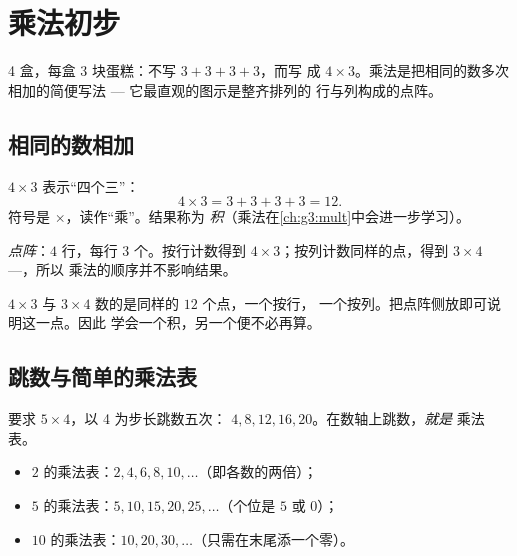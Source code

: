 \chapter{乘法初步}\label{ch:g2:mult}

4 盒，每盒 3 块蛋糕：不写 $3 + 3 + 3 + 3$，而写
成 $4 \times 3$。乘法是把相同的数多次相加的简便写法 ---
它最直观的图示是整齐排列的
行与列构成的点阵。

\section{相同的数相加}

\begin{definition}[乘法]\label{def:g2:mult:def}
$4 \times 3$ 表示“四个三”：
\[
4 \times 3 = 3 + 3 + 3 + 3 = 12 .
\]
符号是 $\times$，读作“乘”。结果称为
\emph{积}（乘法在\cref{ch:g3:mult}中会进一步学习）。
\end{definition}

\begin{omfigure}

{\small \emph{点阵}：$4$ 行，每行 $3$ 个。按行计数得到
$4 \times 3$；按列计数同样的点，得到 $3 \times 4$ ---，所以
乘法的顺序并不影响结果。}
\end{omfigure}

\begin{example}[顺序无关]\label{ex:g2:mult:order}
$4 \times 3$ 与 $3 \times 4$ 数的是同样的 $12$ 个点，一个按行，
一个按列。把点阵侧放即可说明这一点。因此
学会一个积，另一个便不必再算。
\end{example}

\section{跳数与简单的乘法表}

\begin{method}[用跳数编制乘法表]\label{met:g2:mult:skip}
要求 $5 \times 4$，以 4 为步长跳数五次：
$4, 8, 12, 16, 20$。在数轴上跳数，\emph{就是}
乘法表。
\begin{itemize}
  \item $2$ 的乘法表：$2, 4, 6, 8, 10, \dots$（即各数的两倍）；
  \item $5$ 的乘法表：$5, 10, 15, 20, 25, \dots$（个位是 $5$ 或
        $0$）；
  \item $10$ 的乘法表：$10, 20, 30, \dots$（只需在末尾添一个零）。
\end{itemize}
\end{method}

